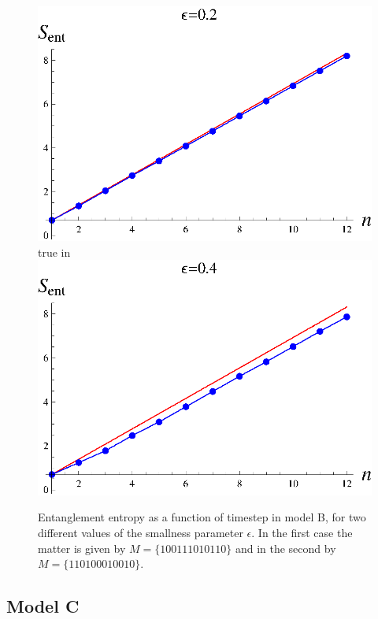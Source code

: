 \documentclass[12pt]{article}
\begin{document}
\begin{figure}[htbp]
\begin{center}
\includegraphics[scale=.58]{modelb2.eps} true in
\includegraphics[scale=.58]{modelb4.eps}
\caption{{Entanglement entropy as a function of timestep in model B, for  two different  values of the smallness parameter $\epsilon$. In the first case the matter is given by $M= \{100111010110\}$ and in the second by $M=\{ 110100010010\}$.}}
\label{fn5m}
\end{center}
\end{figure}


\subsection{Model C}
\end{document}

